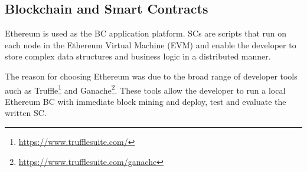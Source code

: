 \subsection{Blockchain and Smart Contracts}
Ethereum is used as the BC application platform. SCs are scripts that run on each node in the Ethereum Virtual Machine (EVM) and enable the developer to store complex data structures and business logic in a distributed manner. 

The reason for choosing Ethereum was due to the broad range of developer tools auch as Truffle\footnote{\href{https://www.trufflesuite.com/}{https://www.trufflesuite.com/}} and Ganache\footnote{\href{https://www.trufflesuite.com/ganache}{https://www.trufflesuite.com/ganache}}. These tools allow the developer to run a local Ethereum BC with immediate block mining and deploy, test and evaluate the written SC. 




